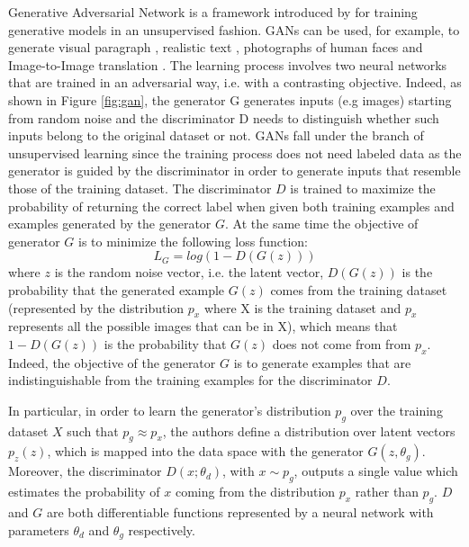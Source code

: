 Generative Adversarial Network is a framework introduced by \citet{art:gan} for training generative models in an unsupervised fashion. GANs can be used, for example, to generate visual paragraph \citep{Liang_2017_ICCV}, realistic text \citep{pmlr-v70-zhang17b}, photographs of human faces \citep{https://doi.org/10.48550/arxiv.1710.10196} and Image-to-Image translation \citep{Isola_2017_CVPR}.
The learning process involves two neural networks that are trained in an adversarial way, i.e. with a contrasting objective. Indeed, as shown in Figure \ref{fig:gan}, the generator G generates inputs (e.g images) starting from random noise and the discriminator D needs to distinguish whether such inputs belong to the original dataset or not. GANs fall under the branch of unsupervised learning since the training process does not need labeled data as the generator is guided by the discriminator in order to generate inputs that resemble those of the training dataset. The discriminator $D$ is trained to maximize the probability of returning the correct label when given both training examples and examples generated by the generator $G$. At the same time the objective of generator $G$ is to minimize the following loss function:
\begin{equation}
  \label{eq:gloss}
  L_G =log(1-D(G(z)))
\end{equation}
where $z$ is the random noise vector, i.e. the latent vector, $D(G(z))$ is the probability that the generated example $G(z)$ comes from the training dataset (represented by the distribution $p_{x}$ where X is the training dataset and $p_{x}$ represents all the possible images that can be in X), which means that $1-D(G(z))$ is the probability that $G(z)$ does not come from from $p_{x}$. Indeed, the objective of the generator $G$ is to generate examples that are indistinguishable from the training examples for the discriminator $D$.

In particular, in order to learn the generator's distribution $p_{g}$ over the training dataset $X$ such that $p_{g}\approx p_{x}$, the authors define a distribution over latent vectors $p_{z}(z)$, which is mapped into the data space with the generator $G(z, \theta_{g})$. Moreover, the discriminator $D(x;\theta_{d})$, with $x \sim p_{g}$, outputs a single value which estimates the probability of $x$ coming from the distribution $p_{x}$ rather than $p_{g}$. $D$ and $G$ are both differentiable functions represented by a neural network with parameters $\theta_{d}$ and $\theta_{g}$ respectively.

